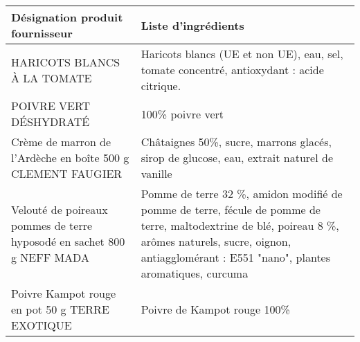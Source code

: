 \begin{tabular}{p{5cm}l}
\toprule
                                        Désignation produit fournisseur &                                                                                                                                                                                              Liste d'ingrédients \\
\midrule
                                            HARICOTS BLANCS À LA TOMATE &                                                                                                                        Haricots blancs (UE et non UE), eau, sel, tomate concentré, antioxydant : acide citrique. \\
                                                 POIVRE VERT DÉSHYDRATÉ &                                                                                                                                                                                                 100\% poivre vert \\
            Crème de marron de l'Ardèche en boîte 500 g CLEMENT FAUGIER &                                                                                                                        Châtaignes 50\%, sucre, marrons glacés, sirop de glucose, eau, extrait naturel de vanille  \\
 Velouté de poireaux pommes de terre hyposodé en sachet 800 g NEFF MADA &  Pomme de terre 32 \%, amidon modifié de pomme de terre, fécule de pomme de terre, maltodextrine de blé, poireau 8 \%, arômes naturels, sucre, oignon, antiagglomérant : E551 "nano", plantes aromatiques, curcuma \\
                         Poivre Kampot rouge en pot 50 g TERRE EXOTIQUE &                                                                                                                                                                                      Poivre de Kampot rouge 100\% \\
\bottomrule
\end{tabular}
